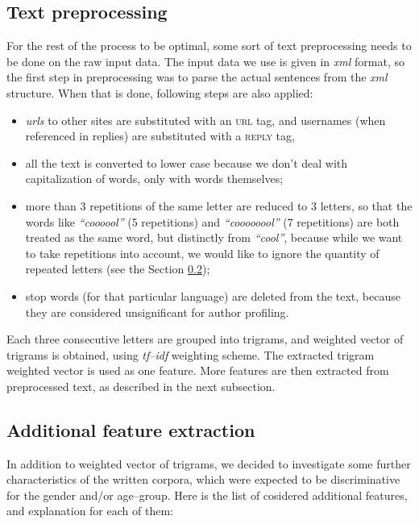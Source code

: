 \documentclass[10pt, a4paper]{article}
\begin{document}
\subsection{Text preprocessing}

For the rest of the process to be optimal, some sort of text preprocessing needs to be done on the raw input data.
The input data we use is given in \textit{xml} format, so the first step in preprocessing was to parse the actual sentences from the \textit{xml} structure.
When that is done, following steps are also applied:
\begin{itemize}
	\item \textit{urls} to other sites are substituted with an \textsc{url} tag, and usernames (when referenced in replies) are substituted with a \textsc{reply} tag,
	\item all the text is converted to lower case because we don't deal with capitalization of words, only with words themselves;
	\item more than 3 repetitions of the same letter are reduced to 3 letters, so that the words like \textit{``coooool''} (5 repetitions) and \textit{``coooooool''} (7 repetitions) are both treated as the same word, but distinctly from \textit{``cool''}, because while we want to take repetitions into account, we would like to ignore the quantity of repeated letters (see the Section \ref{sec:features});
	\item stop words (for that particular language) are deleted from the text, because they are considered unsignificant for author profiling.
\end{itemize}

Each three consecutive letters are grouped into trigrams, and weighted vector of trigrams is obtained, using \textit{tf--idf} weighting scheme.
The extracted trigram weighted vector is used as one feature.
More features are then extracted from preprocessed text, as described in the next subsection.

\subsection{Additional feature extraction}
\label{sec:features}
In addition to weighted vector of trigrams, we decided to investigate some further characteristics of the written corpora, which were expected to be discriminative for the gender and/or age--group.
Here is the list of cosidered additional features, and explanation for each of them:
\end{document}
